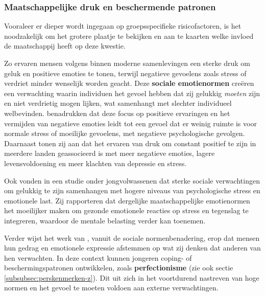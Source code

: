 \subsubsection{Maatschappelijke druk en beschermende patronen}
\label{subsubsec:maatschappij-patronen}

\vspace{1em}

Vooraleer er dieper wordt ingegaan op groepsspecifieke risicofactoren, is het noodzakelijk om het grotere plaatje te bekijken en aan te kaarten welke invloed de maatschappij heeft op deze kwestie.

\vspace{1em}

Zo ervaren mensen volgens \textcite{Dejonckheere2022} binnen moderne samenlevingen een sterke druk om geluk en positieve emoties te tonen, terwijl negatieve gevoelens zoals stress of verdriet minder wenselijk worden geacht. Deze \textbf{sociale emotienormen} creëren een verwachting waarin individuen het gevoel hebben dat zij gelukkig \textit{moeten} zijn en niet verdrietig mogen lijken, wat samenhangt met slechter individueel welbevinden. \textcite{Dejonckheere2022} benadrukken dat deze focus op positieve ervaringen en het vermijden van negatieve emoties leidt tot een gevoel dat er weinig ruimte is voor normale stress of moeilijke gevoelens, met negatieve psychologische gevolgen. Daarnaast tonen zij aan dat het ervaren van druk om constant positief te zijn in meerdere landen geassocieerd is met meer negatieve emoties, lagere levensvoldoening en meer klachten van depressie en stress. 

\vspace{1em}

Ook \textcite{Murdock2026} vonden in een studie onder jongvolwassenen dat sterke sociale verwachtingen om gelukkig te zijn samenhangen met hogere niveaus van psychologische stress en emotionele last. Zij rapporteren dat dergelijke maatschappelijke emotienormen het moeilijker maken om gezonde emotionele reacties op stress en tegenslag te integreren, waardoor de mentale belasting verder kan toenemen.

\vspace{1em}

Verder wijst het werk van \textcite{Aworefa2026}, vanuit de sociale normenbenadering, erop dat mensen hun gedrag en emotionele expressie afstemmen op wat zij denken dat anderen van hen verwachten. In deze context kunnen jongeren coping- of beschermingspatronen ontwikkelen, zoals \textbf{perfectionisme} (zie ook sectie \ref{subsubsec:perskenmerken-z}). Dit uit zich in het voortdurend nastreven van hoge normen en het gevoel te moeten voldoen aan externe verwachtingen.

